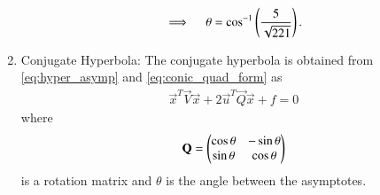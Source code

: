 \begin{enumerate}
\begin{align}
	\implies \quad \theta=\cos^{-1}\left(\frac{5}{\sqrt{221}}\right).
\end{align}
\item {Conjugate Hyperbola: }  The conjugate hyperbola is obtained from \eqref{eq:hyper_asymp} and  \eqref{eq:conic_quad_form}
as 
\begin{align}
\label{eq:conic_quad_form_conjugate}
\vec{x}^T\vec{V}\vec{x}+2\vec{u}^T\vec{Q}\vec{x}+f=0
\end{align}
%
where 
\begin{align}
\mathbf{Q} = \begin{pmatrix}
\cos \theta & -\sin \theta
\\
\sin \theta & \cos \theta 
\end{pmatrix} 
\end{align}
is a rotation matrix and $\theta$ is the angle between the asymptotes.

\end{enumerate}
